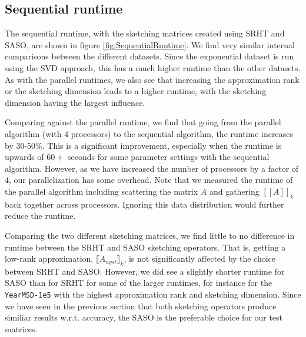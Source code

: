 \documentclass{article}
\theoremstyle{definition}
\begin{document}
\subsection{Sequential runtime}

The sequential runtime, with the sketching matrices created using SRHT and SASO, are shown in figure \ref{fig:SequentialRuntime}. We find very similar internal comparisons between the different datasets. Since the exponential dataset is run using the SVD approach, this has a much higher runtime than the other datasets. As with the parallel runtimes, we also see that increasing the approximation rank or the sketching dimension leads to a higher runtime, with the sketching dimension having the largest influence. 

Comparing against the parallel runtime, we find that going from the parallel algorithm (with $4$ processors) to the sequential algorithm, the runtime increases by 30-50\%. This is a significant improvement, especially when the runtime is upwards of $60+$ seconds for some parameter settings with the sequential algorithm. However, as we have increased the number of processors by a factor of $4$, our parallelization has some overhead. Note that we measured the runtime of the parallel algorithm including scattering the matrix $A$ and gathering $[\![A]\!]_k$ back together across processors. Ignoring this data distribution would further reduce the runtime.

Comparing the two different sketching matrices, we find little to no difference in runtime between the SRHT and SASO sketching operators. That is, getting a low-rank approximation, $\llbracket A_{nyst}\rrbracket_k$, is not significantly affected by the choice between SRHT and SASO. However, we did see a slightly shorter runtime for SASO than for SRHT for some of the larger runtimes, for instance for the \texttt{YearMSD-1e5} with the highest approximation rank and sketching dimension. Since we have seen in the previous section that both sketching operators produce similiar results w.r.t. accuracy, the SASO is the preferable choice for our test matrices.
\end{document}
